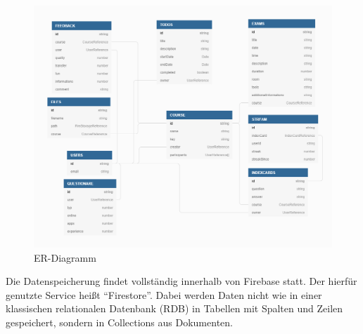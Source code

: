 \begin{figure}[h]%
    \begin{center}
        \includegraphics[width=\textwidth]{img/Integrationsseminar ER.png}
        \caption{ER-Diagramm}
        \label{fig:erDiagramm}
    \end{center}
\end{figure}

Die Datenspeicherung findet vollständig innerhalb von Firebase statt.
Der hierfür genutzte Service heißt \enquote{Firestore}.
Dabei werden Daten nicht wie in einer klassischen relationalen Datenbank (\ac{RDB}) in Tabellen mit Spalten und Zeilen gespeichert, sondern in Collections aus Dokumenten.





